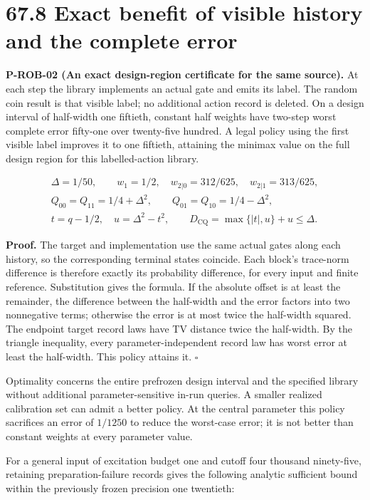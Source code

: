 \documentclass[
  11pt,
  oneside]{book}
\begin{document}
\section{67.8 Exact benefit of visible history and the complete error}

\label{p-rob-02}{}

\textbf{P-ROB-02 (An exact design-region certificate for the same
source).} At each step the library implements an actual gate and emits
its label. The random coin result is that visible label; no additional
action record is deleted. On a design interval of half-width one
fiftieth, constant half weights have two-step worst complete error
fifty-one over twenty-five hundred. A legal policy using the first
visible label improves it to one fiftieth, attaining the minimax value
on the full design region for this labelled-action library.

\[
\begin{gathered}
\Delta=1/50,\qquad
w_1=1/2,\quad w_{2|0}=312/625,\quad w_{2|1}=313/625,\\
Q_{00}=Q_{11}=1/4+\Delta^2,\qquad
Q_{01}=Q_{10}=1/4-\Delta^2,\\
t=q-1/2,\quad u=\Delta^2-t^2,\qquad
D_{\mathrm{CQ}}=\max\{|t|,u\}+u\le\Delta.
\end{gathered}
\]

\textbf{Proof.} The target and implementation use the same actual gates
along each history, so the corresponding terminal states coincide. Each
block's trace-norm difference is therefore exactly its probability
difference, for every input and finite reference. Substitution gives the
formula. If the absolute offset is at least the remainder, the
difference between the half-width and the error factors into two
nonnegative terms; otherwise the error is at most twice the half-width
squared. The endpoint target record laws have TV distance twice the
half-width. By the triangle inequality, every parameter-independent
record law has worst error at least the half-width. This policy attains
it. \(\square\)

Optimality concerns the entire prefrozen design interval and the
specified library without additional parameter-sensitive in-run queries.
A smaller realized calibration set can admit a better policy. At the
central parameter this policy sacrifices an error of \(1/1250\) to
reduce the worst-case error; it is not better than constant weights at
every parameter value.

For a general input of excitation budget one and cutoff four thousand
ninety-five, retaining preparation-failure records gives the following
analytic sufficient bound within the previously frozen precision one
twentieth:
\end{document}
